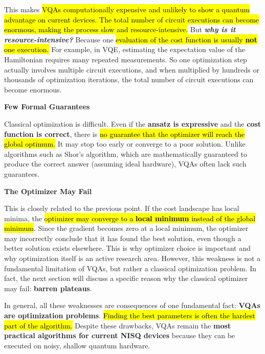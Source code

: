 \highspace
This makes \hl{VQAs computationally expensive and unlikely to show a quantum advantage on current devices. The total number of circuit executions can become enormous, making the process slow and resource-intensive.} But \emph{\textbf{why is it resource-intensive?}} Because one \hl{evaluation of the cost function is usually \textbf{not} one execution.} For example, in VQE, estimating the expectation value of the Hamiltonian requires many repeated measurements. So one optimization step actually involves multiple circuit executions, and when multiplied by hundreds or thousands of optimization iterations, the total number of circuit executions can become enormous.

\newpage

\begin{flushleft}
    \textcolor{Red2}{ \textbf{Few Formal Guarantees}}
\end{flushleft}
Classical optimization is difficult. Even if the \textbf{ansatz is expressive} and the \textbf{cost function is correct}, there is \hl{no guarantee that the optimizer will reach the global optimum.} It may stop too early or converge to a poor solution. Unlike algorithms such as Shor's algorithm, which are mathematically guaranteed to produce the correct answer (assuming ideal hardware), VQAs often lack such guarantees.

\highspace
\begin{flushleft}
    \textcolor{Red2}{ \textbf{The Optimizer May Fail}}
\end{flushleft}
This is closely related to the previous point. If the cost landscape has local minima, the \hl{optimizer may converge to a \textbf{local minimum} instead of the global minimum}. Since the gradient becomes zero at a local minimum, the optimizer may incorrectly conclude that it has found the best solution, even though a better solution exists elsewhere. This is why optimizer choice is important and why optimization itself is an active research area. However, this weakness is not a fundamental limitation of VQAs, but rather a classical optimization problem. In fact, the next section will discuss a specific reason why the classical optimizer may fail: \textbf{barren plateaus}.

\highspace
In general, all these weaknesses are consequences of one fundamental fact: \textbf{VQAs are optimization problems}. \hl{Finding the best parameters is often the hardest part of the algorithm.} Despite these drawbacks, VQAs remain the \textbf{most practical algorithms for current NISQ devices} because they can be executed on noisy, shallow quantum hardware.